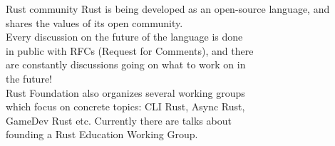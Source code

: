 \documentclass[usenames,dvipsnames,10pt,aspectratio=169]{beamer}
\begin{document}
\begin{frame}{Rust community}
	\large
	Rust is being developed as an open-source language, and\\
	shares the values of its open community.\\

	\vspace{0.3cm}
	Every discussion on the future of the language is done\\
	in public with RFCs (Request for Comments), and there\\
	are constantly discussions going on what to work on in\\
	the future!\\

	\vspace{0.3cm}
	Rust Foundation also organizes several working groups\\
	which focus on concrete topics: CLI Rust, Async Rust,\\
	GameDev Rust etc. Currently there are talks about\\
	founding a Rust Education Working Group.
\end{frame}

\end{document}
